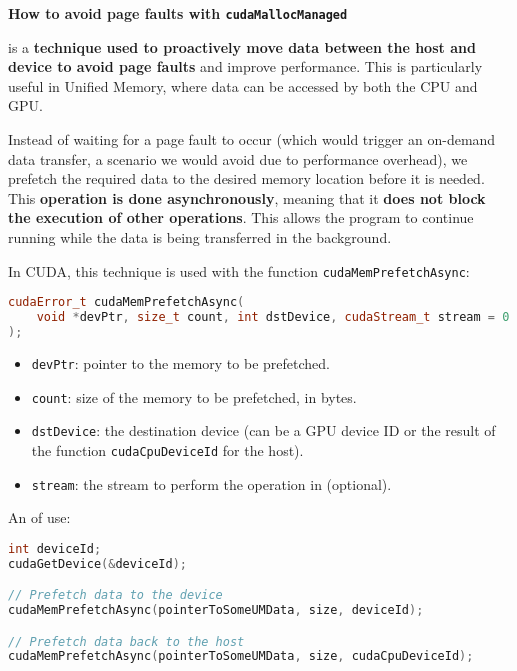 \begin{flushleft}
    \textcolor{Green3}{ \textbf{How to avoid page faults with \texttt{cudaMallocManaged}}}
\end{flushleft}
 is a \textbf{technique used to proactively move data between the host and device to avoid page faults} and improve performance. This is particularly useful in Unified Memory, where data can be accessed by both the CPU and GPU.

\highspace
Instead of waiting for a page fault to occur (which would trigger an on-demand data transfer, a scenario we would avoid due to performance overhead), we prefetch the required data to the desired memory location before it is needed. This \textbf{operation is done asynchronously}, meaning that it \textbf{does not block the execution of other operations}. This allows the program to continue running while the data is being transferred in the background.

\highspace
In CUDA, this technique is used with the function \texttt{cudaMemPrefetchAsync}:
\begin{lstlisting}[language=C++]
cudaError_t cudaMemPrefetchAsync(
    void *devPtr, size_t count, int dstDevice, cudaStream_t stream = 0
);
\end{lstlisting}
\begin{itemize}
    \item \texttt{devPtr}: pointer to the memory to be prefetched.
    \item \texttt{count}: size of the memory to be prefetched, in bytes.
    \item \texttt{dstDevice}: the destination device (can be a GPU device ID or the result of the function \texttt{cudaCpuDeviceId} for the host).
    \item \texttt{stream}: the stream to perform the operation in (optional).
\end{itemize}
An  of use:
\begin{lstlisting}[language=C++]
int deviceId;
cudaGetDevice(&deviceId);

// Prefetch data to the device
cudaMemPrefetchAsync(pointerToSomeUMData, size, deviceId);

// Prefetch data back to the host
cudaMemPrefetchAsync(pointerToSomeUMData, size, cudaCpuDeviceId);
\end{lstlisting}